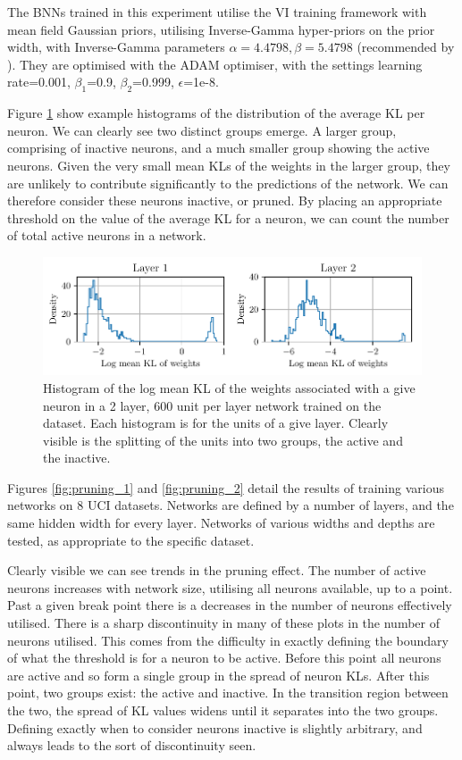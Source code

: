 The BNNs trained in this experiment utilise the VI training framework with mean field Gaussian priors, utilising Inverse-Gamma hyper-priors on the prior width, with Inverse-Gamma parameters \( \alpha=4.4798, \beta=5.4798 \) (recommended by \citet{wu2018fixing}). They are optimised with the ADAM optimiser, with the settings learning rate=0.001, \( \beta_1 \)=0.9, \( \beta_2 \)=0.999, \( \epsilon \)=1e-8.

Figure \ref{fig:pruning_hist} show example histograms of the distribution of the average KL per neuron. We can clearly see two distinct groups emerge. A larger group, comprising of inactive neurons, and a much smaller group showing the active neurons. Given the very small mean KLs of the weights in the larger group, they are unlikely to contribute significantly to the predictions of the network. We can therefore consider these neurons inactive, or pruned. By placing an appropriate threshold on the value of the average KL for a neuron, we can count the number of total active neurons in a network. 

\begin{figure}
	\centering
	\includegraphics{pruning_example}
	\caption{Histogram of the log mean KL of the weights associated with a give neuron in a 2 layer, 600 unit per layer network trained on the \proteinname \: dataset. Each histogram is for the units of a give layer. Clearly visible is the splitting of the units into two groups, the active and the inactive.}
	\label{fig:pruning_hist}
\end{figure}

Figures \ref{fig:pruning_1} and \ref{fig:pruning_2} detail the results of training various networks on 8 UCI datasets. Networks are defined by a number of layers, and the same hidden width for every layer. Networks of various widths and depths are tested, as appropriate to the specific dataset.

Clearly visible we can see trends in the pruning effect. The number of active neurons increases with network size, utilising all neurons available, up to a point. Past a given break point there is a decreases in the number of neurons effectively utilised. There is a sharp discontinuity in many of these plots in the number of neurons utilised. This comes from the difficulty in exactly defining the boundary of what the threshold is for a neuron to be active. Before this point all neurons are active and so form a single group in the spread of neuron KLs. After this point, two groups exist: the active and inactive. In the transition region between the two, the spread of KL values widens until it separates into the two groups. Defining exactly when to consider neurons inactive is slightly arbitrary, and always leads to the sort of discontinuity seen. 

